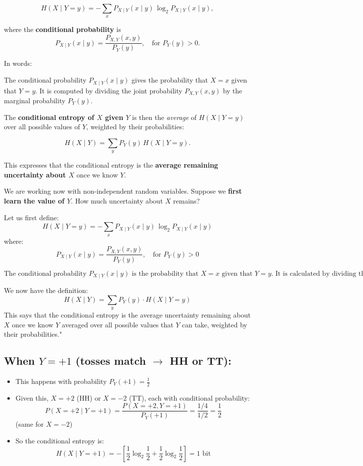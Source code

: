 \documentclass[11pt]{article}
\begin{document}
\[
H(X \mid Y = y) = - \sum_x P_{X \mid Y}(x \mid y) \, \log_2 P_{X \mid Y}(x \mid y),
\]

where the \textbf{conditional probability} is
\[
P_{X \mid Y}(x \mid y) = \frac{P_{X,Y}(x, y)}{P_Y(y)}, \quad \text{for } P_Y(y) > 0.
\]

\noindent In words: 

The conditional probability $P_{X \mid Y}(x \mid y)$ gives the probability that $X = x$ 
 given that $Y = y$. It is computed by dividing the joint probability $P_{X,Y}(x,y)$ 
by the marginal probability $P_Y(y)$.


The \textbf{conditional entropy of $X$ given $Y$} is then the \emph{average} of $H(X \mid Y = y)$ over all possible values of $Y$, weighted by their probabilities:

\[
H(X \mid Y) = \sum_y P_Y(y) \, H(X \mid Y = y).
\]

This expresses that the conditional entropy is the \textbf{average remaining uncertainty about $X$} once we know $Y$.








\newpage
We are working now with non-independent random variables. Suppose we \textbf{first learn the value of $Y$}. How much uncertainty about $X$ remains?

Let us first define:
\[
H(X \mid Y = y) = - \sum_x P_{X \mid Y}(x \mid y) \, \log_2 P_{X \mid Y}(x \mid y)
\]
where:
\[
P_{X \mid Y}(x \mid y) = \frac{P_{X,Y}(x, y)}{P_Y(y)}, \quad \text{for } P_Y(y) > 0
\]

\[\text{The conditional probability } P_{X \mid Y}(x \mid y) \text{ is the probability that } X = x 
\text{ given that } Y = y. \text{ It is calculated by dividing the joint probability } 
P_{X,Y}(x,y) \text{ by the marginal probability } P_Y(y).\]


We now have the definition:
\[
H(X \mid Y) = \sum_y P_Y(y) \cdot H(X \mid Y = y)
\]
This says that the conditional entropy 
is the average uncertainty remaining about 
$X$
once we know 
$Y$
averaged over all possible values that 
$Y$
can take, weighted by their probabilities."

\subsection*{When $Y = +1$ (tosses match $\to$ HH or TT):}
\begin{itemize}
    \item This happens with probability $P_Y(+1) = \frac{1}{2}$
    \item Given this, $X = +2$ (HH) or $X = -2$ (TT), each with conditional probability:
    \[
    P(X = +2 \mid Y = +1) = \frac{P(X=+2, Y=+1)}{P_Y(+1)} = \frac{1/4}{1/2} = \frac{1}{2}
    \]
    (same for $X = -2$)
    \item So the conditional entropy is:
    \[
    H(X \mid Y = +1) = -\left[ \frac{1}{2} \log_2 \frac{1}{2} + \frac{1}{2} \log_2 \frac{1}{2} \right] = 1 \text{ bit}
    \]
\end{itemize}
\end{document}
